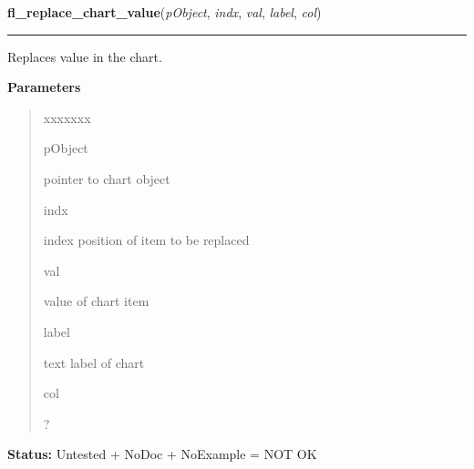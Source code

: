 \hspace{.8\funcindent}\begin{boxedminipage}{\funcwidth}

    \raggedright \textbf{fl\_replace\_chart\_value}(\textit{pObject}, \textit{indx}, \textit{val}, \textit{label}, \textit{col})

    \vspace{-1.5ex}

    \rule{\textwidth}{0.5\fboxrule}
\setlength{\parskip}{2ex}
    Replaces value in the chart.

\setlength{\parskip}{1ex}
      \textbf{Parameters}
      \vspace{-1ex}

      \begin{quote}
        \begin{Ventry}{xxxxxxx}

          \item[pObject]

          pointer to chart object

          \item[indx]

          index position of item to be replaced

          \item[val]

          value of chart item

          \item[label]

          text label of chart

          \item[col]

          ?

        \end{Ventry}

      \end{quote}

\textbf{Status:} Untested + NoDoc + NoExample = NOT OK



    \end{boxedminipage}

    \label{xformslib:library:fl_set_chart_bounds}

    \vspace{0.5ex}

